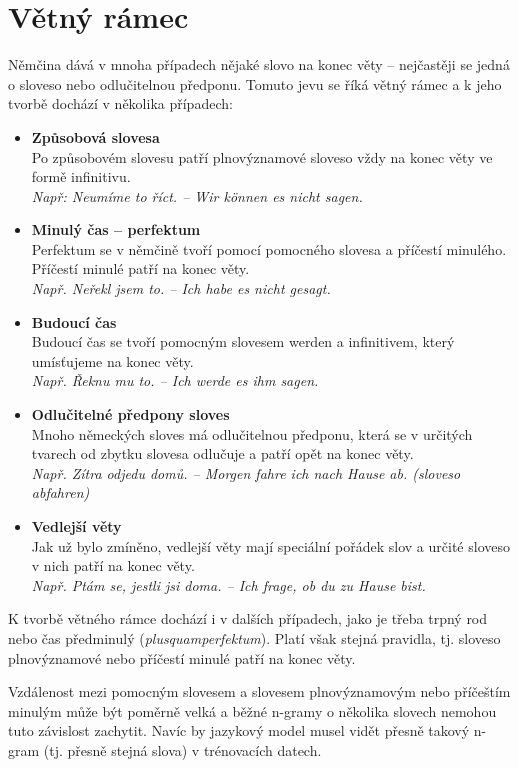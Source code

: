\documentclass[12pt,a4paper]{report}
\begin{document}
\section{Větný rámec}
Němčina dává v mnoha případech nějaké slovo na konec věty -- nejčastěji se jedná o sloveso nebo odlučitelnou předponu. Tomuto jevu se říká větný rámec a k jeho tvorbě dochází v několika případech:
\begin{itemize}
\item
\textbf{Způsobová slovesa}\\
Po způsobovém slovesu patří plnovýznamové sloveso vždy na konec věty ve formě infinitivu. \\
\textit{Např: Neumíme to říct. -- Wir können es nicht sagen.}
\item
\textbf{Minulý čas -- perfektum}\\
Perfektum se v němčině tvoří pomocí pomocného slovesa a příčestí minulého. Příčestí minulé patří na konec věty.\\
\textit{Např. Neřekl jsem to. -- Ich habe es nicht gesagt.}
\item
\textbf{Budoucí čas} \\
Budoucí čas se tvoří pomocným slovesem werden a infinitivem, který umísťujeme na konec věty.\\
\textit{Např. Řeknu mu to. -- Ich werde es ihm sagen.}
\item
\textbf{Odlučitelné předpony sloves}\\
Mnoho německých sloves má odlučitelnou předponu, která se v určitých tvarech od zbytku slovesa odlučuje a patří opět na konec věty.\\
\textit{Např. Zítra odjedu domů. -- Morgen fahre ich nach Hause ab. (sloveso abfahren)}
\item
\textbf{Vedlejší věty}\\
Jak už bylo zmíněno, vedlejší věty mají speciální pořádek slov a určité sloveso v nich patří na konec věty.\\
\textit{Např. Ptám se, jestli jsi doma. -- Ich frage, ob du zu Hause bist.}
\end{itemize}

K tvorbě větného rámce dochází i v dalších případech, jako je třeba trpný rod nebo čas předminulý (\textit{plusquamperfektum}). Platí však stejná pravidla, tj. sloveso plnovýznamové nebo příčestí minulé patří na konec věty.

Vzdálenost mezi pomocným slovesem a slovesem plnovýznamovým nebo příčeštím minulým může být poměrně velká a běžné n-gramy o několika slovech nemohou tuto závislost zachytit. Navíc by jazykový model musel vidět přesně takový n-gram (tj. přesně stejná slova) v trénovacích datech.
\end{document}
